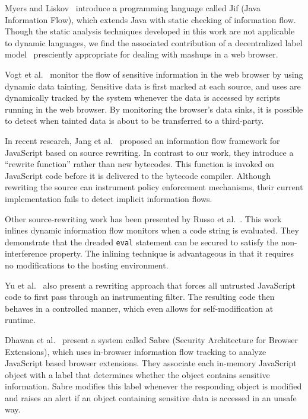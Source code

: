 Myers and Liskov~\cite{363526} introduce a programming language called Jif (Java Information Flow), which extends Java with static checking of information flow.
Though the static analysis techniques developed in this work are not applicable to dynamic languages, we find the associated contribution of a decentralized label model~\cite{363526} presciently appropriate for dealing with mashups in a web browser.

Vogt et al.~\cite{Vogt_CrossSiteScripting_2007} monitor the flow of sensitive information in the web browser by using dynamic data tainting.
Sensitive data is first marked at each source, and uses are dynamically tracked by the system whenever the data is accessed by scripts running in the web browser.
By monitoring the browser's data sinks, it is possible to detect when tainted data is about to be transferred to a third-party.

In recent research, Jang et al.~\cite{1866339} proposed an information flow framework for JavaScript based on source rewriting.
In contrast to our work, they introduce a ``rewrite function'' rather than new bytecodes.
This function is invoked on JavaScript code before it is delivered to the bytecode compiler.
Although rewriting the source can instrument policy enforcement mechanisms, their current implementation fails to detect implicit information flows.

Other source-rewriting work has been presented by Russo et al.~\cite{onthefly}.
This work inlines dynamic information flow monitors when a code string is evaluated.
They demonstrate that the dreaded \texttt{eval} statement can be secured to satisfy the non-interference property.
The inlining technique is advantageous in that it requires no modifications to the hosting environment.

Yu et al.~\cite{1190252} also present a rewriting approach that forces all untrusted JavaScript code to first pass through an instrumenting filter.
The resulting code then behaves in a controlled manner, which even allows for self-modification at runtime.

Dhawan et al.~\cite{1723250} present a system called Sabre (Security Architecture for Browser Extensions), which uses in-browser information flow tracking to analyze JavaScript based browser extensions.
They associate each in-memory JavaScript object with a label that determines whether the object contains sensitive information.
Sabre modifies this label whenever the responding object is modified and raises an alert if an object containing sensitive data is accessed in an unsafe way.

